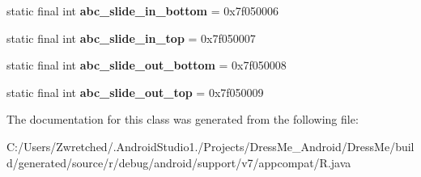 \begin{DoxyCompactItemize}
\item 
\hypertarget{classandroid_1_1support_1_1v7_1_1appcompat_1_1_r_1_1anim_abb2d88595ab4324c44388605906fa733}{}static final int {\bfseries abc\+\_\+slide\+\_\+in\+\_\+bottom} = 0x7f050006\label{classandroid_1_1support_1_1v7_1_1appcompat_1_1_r_1_1anim_abb2d88595ab4324c44388605906fa733}

\item 
\hypertarget{classandroid_1_1support_1_1v7_1_1appcompat_1_1_r_1_1anim_ac0aa69e88ce72f0047081d13502c4068}{}static final int {\bfseries abc\+\_\+slide\+\_\+in\+\_\+top} = 0x7f050007\label{classandroid_1_1support_1_1v7_1_1appcompat_1_1_r_1_1anim_ac0aa69e88ce72f0047081d13502c4068}

\item 
\hypertarget{classandroid_1_1support_1_1v7_1_1appcompat_1_1_r_1_1anim_a112797338f6fb204a8a1c71bad3e4367}{}static final int {\bfseries abc\+\_\+slide\+\_\+out\+\_\+bottom} = 0x7f050008\label{classandroid_1_1support_1_1v7_1_1appcompat_1_1_r_1_1anim_a112797338f6fb204a8a1c71bad3e4367}

\item 
\hypertarget{classandroid_1_1support_1_1v7_1_1appcompat_1_1_r_1_1anim_aeeecf1b8df70f0cdb528bf29ffc04fa8}{}static final int {\bfseries abc\+\_\+slide\+\_\+out\+\_\+top} = 0x7f050009\label{classandroid_1_1support_1_1v7_1_1appcompat_1_1_r_1_1anim_aeeecf1b8df70f0cdb528bf29ffc04fa8}

\end{DoxyCompactItemize}


The documentation for this class was generated from the following file\+:\begin{DoxyCompactItemize}
\item 
C\+:/\+Users/\+Zwretched/.\+Android\+Studio1./\+Projects/\+Dress\+Me\+\_\+\+Android/\+Dress\+Me/build/generated/source/r/debug/android/support/v7/appcompat/R.\+java\end{DoxyCompactItemize}
